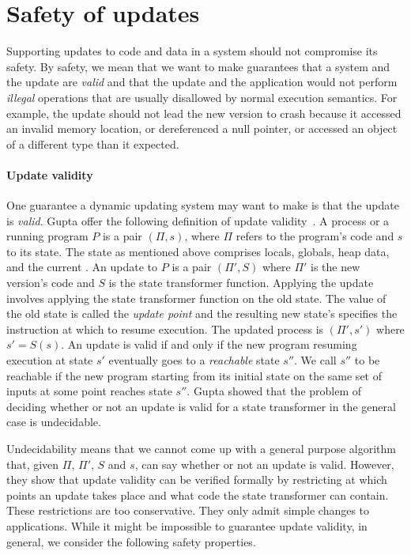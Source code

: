 \section{Safety of updates}
\label{sec:safety}

Supporting updates to code and data in a system should not compromise its
safety. By safety, we mean that we want to make guarantees that a \USD
system and the update are \emph{valid} and that the update and the
application would not perform \emph{illegal} operations that are usually
disallowed by normal execution semantics. For example, the update should
not lead the new version to crash because it accessed an invalid memory
location, or dereferenced a null pointer, or accessed an object of a
different type than it expected.

\paragraph{Update validity}

One guarantee a dynamic updating system may want to make is that the update is
\emph{valid}. Gupta \EA offer the following
definition of update validity~\cite{Gupta96,gupta-thesis}. A process or a running program $P$ is a pair
$(\Pi, s)$, where $\Pi$ refers to the program's code and $s$ to its state.
The state as mentioned above comprises locals, globals, heap data, and the
current \PC. An update to $P$ is a pair $(\Pi', S)$ where $\Pi'$ is the new
version's code and $S$ is the state transformer function. Applying the
update involves applying the state transformer function on the old state.
The \PC value of the old state is called the {\em update point} and the
resulting new state's \PC specifies the instruction at which to resume execution.
The updated process is $(\Pi', s')$ where $s' = S(s)$. An update is valid
if and only if the new program resuming execution at state $s'$ eventually
goes to a {\em reachable} state $s''$. We call $s''$ to be reachable if the
new program starting from its initial state on the same set of inputs at
some point reaches state $s''$. Gupta \EA showed that the problem of
deciding whether or not an update is valid for a state transformer in the
general case is undecidable.

Undecidability means that we cannot come up with a general purpose
algorithm that, given $\Pi$, $\Pi'$, $S$ and $s$, can say whether or not an
update is valid. However, they show that update validity can be verified
formally by restricting at which points an update takes place and what code
the state transformer can contain.  These restrictions are too
conservative. They only admit simple changes to applications.  While
it might be impossible to guarantee update validity, in general, we
consider the following safety properties.

